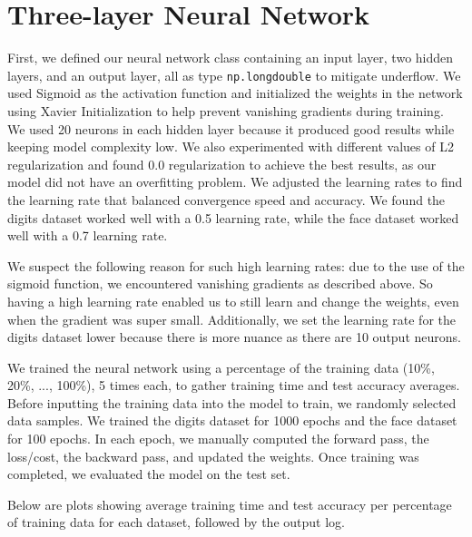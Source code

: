 \documentclass{article}
\begin{document}
\section*{Three-layer Neural Network}
First, we defined our neural network class containing an input layer, two hidden layers, and an output layer, all as type \texttt{np.longdouble} to mitigate underflow. We used Sigmoid as the activation function and initialized the weights in the network using Xavier Initialization to help prevent vanishing gradients during training. We used 20 neurons in each hidden layer because it produced good results while keeping model complexity low. We also experimented with different values of L2 regularization and found 0.0 regularization to achieve the best results, as our model did not have an overfitting problem. We adjusted the learning rates to find the learning rate that balanced convergence speed and accuracy. We found the digits dataset worked well with a 0.5 learning rate, while the face dataset worked well with a 0.7 learning rate. 

\noindent We suspect the following reason for such high learning rates: due to the use of the sigmoid function, we encountered vanishing gradients as described above. So having a high learning rate enabled us to still learn and change the weights, even when the gradient was super small. Additionally, we set the learning rate for the digits dataset lower because there is more nuance as there are 10 output neurons.

\noindent We trained the neural network using a percentage of the training data (10\%, 20\%, ..., 100\%), 5 times each, to gather training time and test accuracy averages. Before inputting the training data into the model to train, we randomly selected data samples. We trained the digits dataset for 1000 epochs and the face dataset for 100 epochs. In each epoch, we manually computed the forward pass, the loss/cost, the backward pass, and updated the weights. Once training was completed, we evaluated the model on the test set. 

\noindent Below are plots showing average training time and test accuracy per percentage of training data for each dataset,
followed by the output log.
\end{document}
